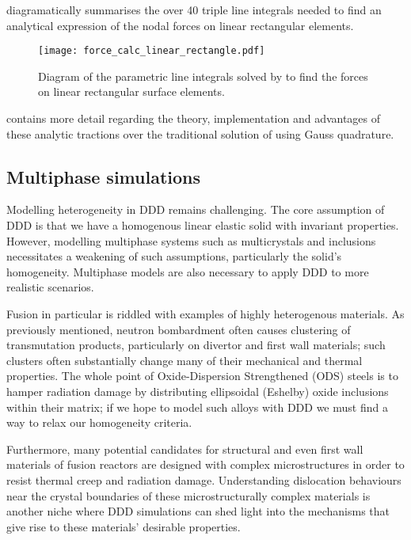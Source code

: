  diagramatically summarises the over 40 triple line integrals needed to find an analytical expression of the nodal forces on linear rectangular elements.
\begin{figure}
  \centering
  \texttt{[image: force\_calc\_linear\_rectangle.pdf]}
  \caption[Analytic tractions on linear rectangular surface elements.]{Diagram of the parametric line integrals solved by \citet{analytic_tractions} to find the forces on linear rectangular surface elements.}
  \label{f:force_lin_rectIntro}
\end{figure}
 contains more detail regarding the theory, implementation and advantages of these analytic tractions over the traditional solution of using Gauss quadrature.

\subsection{Multiphase simulations}
\label{ss:multiphase}

Modelling heterogeneity in DDD remains challenging. The core assumption of DDD is that we have a homogenous linear elastic solid with invariant properties. However, modelling multiphase systems such as multicrystals and inclusions necessitates a weakening of such assumptions, particularly the solid's homogeneity. Multiphase models are also necessary to apply DDD to more realistic scenarios.

Fusion in particular is riddled with examples of highly heterogenous materials. As previously mentioned, neutron bombardment often causes clustering of transmutation products, particularly on divertor and first wall materials; such clusters often substantially change many of their mechanical and thermal properties. The whole point of Oxide-Dispersion Strengthened (ODS) steels \cite{ddd_ods} is to hamper radiation damage by distributing ellipsoidal (Eshelby) oxide inclusions \cite{eshelby1,eshelby2} within their matrix; if we hope to model such alloys with DDD we must find a way to relax our homogeneity criteria.

Furthermore, many potential candidates for structural and even first wall materials of fusion reactors are designed with complex microstructures in order to resist thermal creep and radiation damage. Understanding dislocation behaviours near the crystal boundaries of these microstructurally complex materials is another niche where DDD simulations can shed light into the mechanisms that give rise to these materials' desirable properties.

